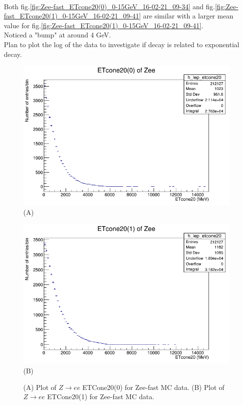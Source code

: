 \\
Both fig.\ref{fig:Zee-fast_ETcone20(0)_0-15GeV_16-02-21_09-34} and fig.\ref{fig:Zee-fast_ETcone20(1)_0-15GeV_16-02-21_09-41} are similar with a larger mean value for fig.\ref{fig:Zee-fast_ETcone20(1)_0-15GeV_16-02-21_09-41}.
\\
Noticed a "bump" at around 4 GeV.
\\
Plan to plot the log of the data to investigate if decay is related to exponential decay.
\begin{figure}[h!]
    \centering
    \begin{minipage}{0.5\textwidth}
        \centering
        \includegraphics[width=\linewidth]{plots/16-02-2021/Zee-fast_ETcone20(0)_0-15GeV_16-02-21_09-34}
        (A)
    \end{minipage}\hfill
    \begin{minipage}{0.5\textwidth}
        \centering
        \includegraphics[width=\linewidth]{plots/16-02-2021/Zee-fast_ETcone20(1)_0-15GeV_16-02-21_09-41}
        (B)
    \end{minipage}
    \caption{ (A) Plot of $Z \rightarrow ee$ ETCone20(0) for Zee-fast MC data. (B) Plot of  $Z \rightarrow ee$ ETCone20(1) for Zee-fast MC data.}
    \label{fig:}
\end{figure}

